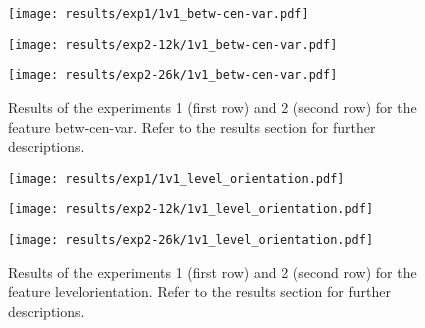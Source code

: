 \begin{figure}[h!]
	\centering
	\begin{minipage}{0.4\linewidth}
		\texttt{[image: results/exp1/1v1\_betw-cen-var.pdf]}
	\end{minipage}
	
	\begin{minipage}{0.4\linewidth}
		\texttt{[image: results/exp2-12k/1v1\_betw-cen-var.pdf]}
	\end{minipage}
	\begin{minipage}{0.4\linewidth}
		\texttt{[image: results/exp2-26k/1v1\_betw-cen-var.pdf]}
	\end{minipage}
	
	\caption[ Results: Feature betw-cen-var]{ Results of the experiments 1 (first row) and 2 (second row) for the feature betw-cen-var. Refer to the results section for further descriptions. }
	\label{fig:appendix_betw-cen-var}
\end{figure}

\begin{figure}[h!]
	\centering
	\begin{minipage}{0.4\linewidth}
		\texttt{[image: results/exp1/1v1\_level\_orientation.pdf]}
	\end{minipage}
	
	\begin{minipage}{0.4\linewidth}
		\texttt{[image: results/exp2-12k/1v1\_level\_orientation.pdf]}
	\end{minipage}
	\begin{minipage}{0.4\linewidth}
		\texttt{[image: results/exp2-26k/1v1\_level\_orientation.pdf]}
	\end{minipage}
	
	\caption[ Results: Feature level\textunderscore orientation]{ Results of the experiments 1 (first row) and 2 (second row) for the feature level\textunderscore orientation. Refer to the results section for further descriptions. }
	\label{fig:appendix_level_orientation}
\end{figure}
